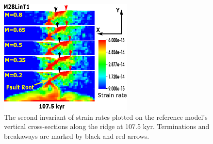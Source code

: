 \begin{figure}[h]
  \centering
    \includegraphics[width=0.6\textwidth]{./Figures/fig_Results1_2.eps}
  \caption{The second invariant of strain rates plotted on the reference model's vertical cross-sections along the ridge at 107.5 kyr. Terminations and breakaways are marked by black and red arrows.}
 \label{fig_Results1_2}
\end{figure}   


